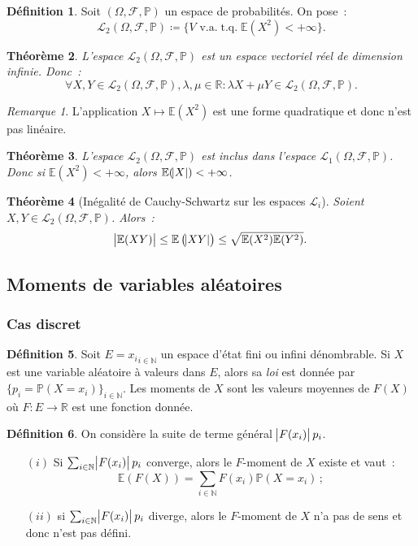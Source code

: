 \documentclass{article}
\newcommand{\E}{\mathbb E}
\newcommand{\N}{\mathbb N}
\renewcommand{\P}{\mathbb P}
\newcommand{\R}{\mathbb R}
\newcommand{\espproba}[3]{\left(#1, #2, #3\right)}  %
\newcommand{\Ofp}{\espproba \Omega{\mathcal F}\P}  %
\newcommand{\Lu}{\mathcal L_1\Ofp}  %
\newcommand{\Ld}{\mathcal L_2\Ofp}  %
\DeclareMathOperator{\tq}{t.q.}
\newtheorem{thm}{Théorème}[section]
\theoremstyle{definition}
\newtheorem{déf}[thm]{Définition}
\theoremstyle{remark}
\newtheorem*{rmq}{Remarque}
\begin{document}
		\begin{déf} Soit $\Ofp$ un espace de probabilités. On pose~:
		\[\Ld \coloneqq \{V \text{ v.a.} \tq \E(X^2) < +\infty\}.\]
		\end{déf}

		\begin{thm} L'espace $\Ld$ est un espace vectoriel réel de dimension infinie. Donc~:
		\[\forall X, Y \in \Ld, \lambda, \mu \in \R : \lambda X + \mu Y \in \Ld.\]
		\end{thm}

		\begin{rmq} L'application $X \mapsto \E(X^2)$ est une forme quadratique et donc n'est pas linéaire. \end{rmq}

		\begin{thm} L'espace $\Ld$ est inclus dans l'espace $\Lu$. Donc si $\E(X^2) < +\infty$, alors $\E(\abs X) < +\infty$. \end{thm}

		\begin{thm}[Inégalité de Cauchy-Schwartz sur les espaces $\mathcal L_i$] Soient $X, Y \in \Ld$. Alors~:
		\begin{equation}\label{eq:C-SL2}
			\abs {\E(XY)} \leq \E\left(\abs {XY}\right) \leq \sqrt{\E(X^2)\E(Y^2)}.
		\end{equation}
		\end{thm}

	\subsection{Moments de variables aléatoires}
		\subsubsection{Cas discret}
		\begin{déf} Soit $E = {x_i}_{i \in \N}$ un espace d'état fini ou infini dénombrable. Si $X$ est une variable aléatoire à valeurs dans $E$, alors sa 
		\emph{loi} est donnée par $\{p_i = \P(X = x_i)\}_{i \in \N}$. Les moments de $X$ sont les valeurs moyennes de $F(X)$ où $F : E \to \R$ est une fonction
		donnée. \end{déf}

		\begin{déf} On considère la suite de terme général $\abs {F(x_i)}p_i$.

		\begin{itemize}
			\item[$(i)$] Si $\sum_{i \in \N}\abs{F(x_i)}p_i$ converge, alors le $F$-moment de $X$ existe et vaut~:
			             \[\E(F(X)) = \sum_{i \in \N}F(x_i)\P(X=x_i)\,;\]
			\item[$(ii)$] si $\sum_{i \in \N}\abs{F(x_i)}p_i$ diverge, alors le $F$-moment de $X$ n'a pas de sens et donc n'est pas défini.
		\end{itemize}
		\end{déf}
\end{document}
